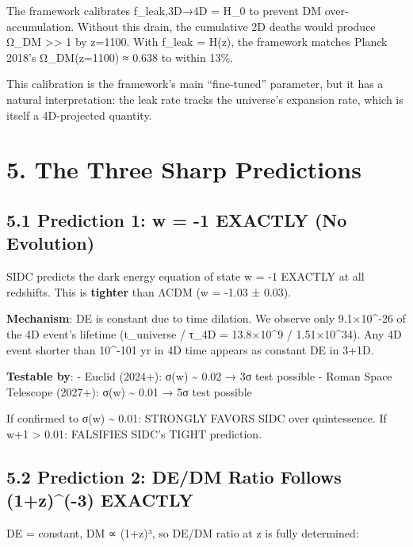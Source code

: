 The framework calibrates f\_leak,3D→4D = H\_0 to prevent DM
over-accumulation. Without this drain, the cumulative 2D deaths would
produce Ω\_DM \textgreater\textgreater{} 1 by z=1100. With f\_leak =
H(z), the framework matches Planck 2018's Ω\_DM(z=1100) ≈ 0.638 to
within 13\%.

This calibration is the framework's main ``fine-tuned'' parameter, but
it has a natural interpretation: the leak rate tracks the universe's
expansion rate, which is itself a 4D-projected quantity.

\hypertarget{the-three-sharp-predictions}{%
\section{5. The Three Sharp
Predictions}\label{the-three-sharp-predictions}}

\hypertarget{prediction-1-w--1-exactly-no-evolution}{%
\subsection{5.1 Prediction 1: w = -1 EXACTLY (No
Evolution)}\label{prediction-1-w--1-exactly-no-evolution}}

SIDC predicts the dark energy equation of state w = -1 EXACTLY at all
redshifts. This is \textbf{tighter} than ΛCDM (w = -1.03 ± 0.03).

\textbf{Mechanism}: DE is constant due to time dilation. We observe only
9.1×10\^{}-26 of the 4D event's lifetime (t\_universe / τ\_4D =
13.8×10\^{}9 / 1.51×10\^{}34). Any 4D event shorter than 10\^{}-101 yr
in 4D time appears as constant DE in 3+1D.

\textbf{Testable by}: - Euclid (2024+): σ(w) \textasciitilde{} 0.02 → 3σ
test possible - Roman Space Telescope (2027+): σ(w) \textasciitilde{}
0.01 → 5σ test possible

If confirmed to σ(w) \textasciitilde{} 0.01: STRONGLY FAVORS SIDC over
quintessence. If \textbar w+1\textbar{} \textgreater{} 0.01: FALSIFIES
SIDC's TIGHT prediction.

\hypertarget{prediction-2-dedm-ratio-follows-1z-3-exactly}{%
\subsection{5.2 Prediction 2: DE/DM Ratio Follows (1+z)\^{}(-3)
EXACTLY}\label{prediction-2-dedm-ratio-follows-1z-3-exactly}}

DE = constant, DM ∝ (1+z)³, so DE/DM ratio at z is fully determined:


